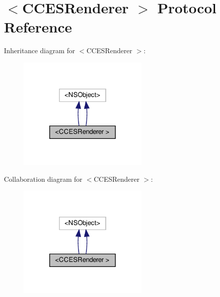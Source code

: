 \hypertarget{protocolCCESRenderer_01-p}{}\section{$<$C\+C\+E\+S\+Renderer $>$ Protocol Reference}
\label{protocolCCESRenderer_01-p}


Inheritance diagram for $<$C\+C\+E\+S\+Renderer $>$\+:
\nopagebreak
\begin{figure}[H]
\begin{center}
\leavevmode
\includegraphics[width=180pt]{protocolCCESRenderer_01-p__inherit__graph}
\end{center}
\end{figure}


Collaboration diagram for $<$C\+C\+E\+S\+Renderer $>$\+:
\nopagebreak
\begin{figure}[H]
\begin{center}
\leavevmode
\includegraphics[width=180pt]{protocolCCESRenderer_01-p__coll__graph}
\end{center}
\end{figure}
